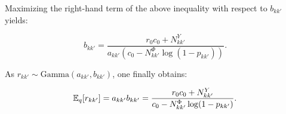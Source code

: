 Maximizing the right-hand term of the above inequality with respect to $b_{kk'}$ yields:

\begin{equation} \label{eq:update2}
b_{kk'} = \frac{r_0 c_0 + N^Y_{kk'}}{a_{kk'} (c_0 - N^\Phi_{kk'} \log(1-p_{kk'}))}. \nonumber
\end{equation}

As $r_{kk'} \sim \textrm{Gamma}(a_{kk'},b_{kk'})$, one finally obtains:

\begin{equation}
\mathbb{E}_q[r_{kk'}] = a_{kk'} b_{kk'} = \frac{r_0 c_0 + N^Y_{kk'}}{c_0 - N^\Phi_{kk'} \log(1-p_{kk'})}. \nonumber
\end{equation}


%
%
%
%
%
%

